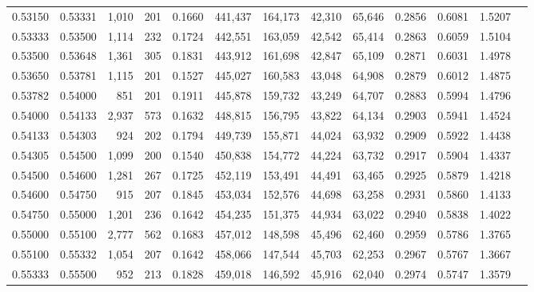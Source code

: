 \begin{tabular}{rrrrrrrrrrrrr}
0.53150 & 0.53331 & 1,010 & 201 &                                     0.1660 & 441,437 & 164,173 &  42,310 &  65,646 & 0.2856 & 0.6081 & 1.5207 \\
0.53333 & 0.53500 & 1,114 & 232 &                                     0.1724 & 442,551 & 163,059 &  42,542 &  65,414 & 0.2863 & 0.6059 & 1.5104 \\
0.53500 & 0.53648 & 1,361 & 305 &                                     0.1831 & 443,912 & 161,698 &  42,847 &  65,109 & 0.2871 & 0.6031 & 1.4978 \\
0.53650 & 0.53781 & 1,115 & 201 &                                     0.1527 & 445,027 & 160,583 &  43,048 &  64,908 & 0.2879 & 0.6012 & 1.4875 \\
0.53782 & 0.54000 &   851 & 201 &                                     0.1911 & 445,878 & 159,732 &  43,249 &  64,707 & 0.2883 & 0.5994 & 1.4796 \\
0.54000 & 0.54133 & 2,937 & 573 &                                     0.1632 & 448,815 & 156,795 &  43,822 &  64,134 & 0.2903 & 0.5941 & 1.4524 \\
0.54133 & 0.54303 &   924 & 202 &                                     0.1794 & 449,739 & 155,871 &  44,024 &  63,932 & 0.2909 & 0.5922 & 1.4438 \\
0.54305 & 0.54500 & 1,099 & 200 &                                     0.1540 & 450,838 & 154,772 &  44,224 &  63,732 & 0.2917 & 0.5904 & 1.4337 \\
0.54500 & 0.54600 & 1,281 & 267 &                                     0.1725 & 452,119 & 153,491 &  44,491 &  63,465 & 0.2925 & 0.5879 & 1.4218 \\
0.54600 & 0.54750 &   915 & 207 &                                     0.1845 & 453,034 & 152,576 &  44,698 &  63,258 & 0.2931 & 0.5860 & 1.4133 \\
0.54750 & 0.55000 & 1,201 & 236 &                                     0.1642 & 454,235 & 151,375 &  44,934 &  63,022 & 0.2940 & 0.5838 & 1.4022 \\
0.55000 & 0.55100 & 2,777 & 562 &                                     0.1683 & 457,012 & 148,598 &  45,496 &  62,460 & 0.2959 & 0.5786 & 1.3765 \\
0.55100 & 0.55332 & 1,054 & 207 &                                     0.1642 & 458,066 & 147,544 &  45,703 &  62,253 & 0.2967 & 0.5767 & 1.3667 \\
0.55333 & 0.55500 &   952 & 213 &                                     0.1828 & 459,018 & 146,592 &  45,916 &  62,040 & 0.2974 & 0.5747 & 1.3579 \\

\end{tabular}
